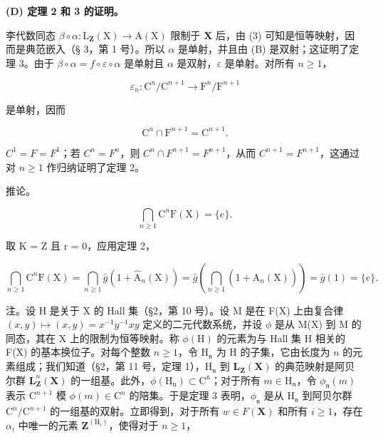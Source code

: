 \textbf{(D) 定理 2 和 3 的证明。}

李代数同态 \(\beta \circ \alpha: \mathrm{L}_{\mathbf{Z}}(\mathrm{X}) \to \mathrm{A}(\mathrm{X})\) 限制于 \(\mathbf{X}\) 后，由 (3) 可知是恒等映射，因而是典范嵌入（§ 3，第 1 号）。所以 \(\alpha\) 是单射，并且由 (B) 是双射；这证明了定理 3。由于 \(\beta \circ \alpha = f \circ \varepsilon \circ \alpha\) 是单射且 \(\alpha\) 是双射，\(\varepsilon\) 是单射。对所有 \(n \geqslant 1\)，

\[
\varepsilon_ {n} \colon \mathrm{C} ^ {n} / \mathrm{C} ^ {n + 1} \rightarrow \mathrm{F} ^ {n} / \mathrm{F} ^ {n + 1}
\]

是单射，因而

\[
\mathrm{C} ^ {n} \cap \mathrm{F} ^ {n + 1} = \mathrm{C} ^ {n + 1}.
\]

\(C^{1} = F = F^{1}\)；若 \(C^{n} = F^{n}\)，则 \(C^{n} \cap F^{n+1} = F^{n+1}\)，从而 \(C^{n+1} = F^{n+1}\)，这通过对 \(n \geqslant 1\) 作归纳证明了定理 2。

推论。

\[
\bigcap_ {n \geqslant 1} \mathrm{C} ^ {n} \mathrm{F} (\mathrm{X}) = \{e \}.
\]

取 K = Z 且 r = 0，应用定理 2，

\[
\bigcap_ {n \geqslant 1} \mathrm{C} ^ {n} \mathrm{F} (\mathrm{X}) = \bigcap_ {n \geqslant 1} \bar {g} (1 + \hat {\mathrm{A}} _ {n} (\mathrm{X})) = \bar {g} \left(\bigcap_ {n \geqslant 1} (1 + \hat {\mathrm{A}} _ {n} (\mathrm{X}))\right) = \bar {g} (1) = \{e \}.
\]

注。设 H 是关于 X 的 Hall 集（§2，第 10 号）。设 M 是在 F(X) 上由复合律 \((x,y)\mapsto (x,y) = x^{-1}y^{-1}xy\) 定义的二元代数系统，并设 \(\phi\) 是从 M(X) 到 M 的同态，其在 X 上的限制为恒等映射。称 \(\phi (\mathrm{H})\) 的元素为与 Hall 集 H 相关的 F(X) 的基本换位子。对每个整数 \(n\geqslant 1\)，令 \(\mathrm{H}_{\mathfrak{n}}\) 为 H 的子集，它由长度为 \(n\) 的元素组成；我们知道（§2，第 11 号，定理 1），\(\mathrm{H}_{\mathfrak{n}}\) 到 \(\mathbf{L}_{\mathbf{Z}}(\mathbf{X})\) 的典范映射是阿贝尔群 \(\mathbf{L}_{\mathbf{Z}}^{n} (\mathbf{X})\) 的一组基。此外，\(\phi (\mathrm{H_n})\subset \mathrm{C^n}\)；对于所有 \(m\in \mathrm{H}_{\mathfrak{n}}\)，令 \(\phi_{\mathfrak{n}}(m)\) 表示 \(\mathrm{C}^{n + 1}\) 模 \(\phi (m)\in \mathrm{C}^n\) 的陪集。于是定理 3 表明，\(\phi_{\mathfrak{n}}\) 是从 \(\mathrm{H}_{\mathfrak{n}}\) 到阿贝尔群 \(\mathrm{C}^n /\mathrm{C}^{n + 1}\) 的一组基的双射。立即得到，对于所有 \(w\in F(\mathbf{X})\) 和所有 \(i\geqslant 1\)，存在 \(\alpha_{i}\) 中唯一的元素 \(\mathbf{Z}^{(\mathrm{H}_{i})}\)，使得对于 \(n\geqslant 1\)，

